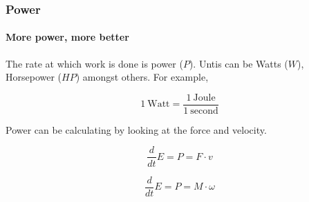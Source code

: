 \documentclass{beamer}%
\begin{document}
\begin{frame}
	\frametitle{Power}
	\framesubtitle{More power, more better}
	
	The rate at which work is done is power ($P$). Untis can be Watts ($W$), Horsepower ($HP$) amongst others. For example,
	
	\begin{equation}
		1 \ \mbox{Watt} = \frac{1 \ \mbox{Joule}}{1 \ \mbox{second}} \nonumber
	\end{equation}
	
	Power can be calculating by looking at the force and velocity.
	
	\begin{equation}
		\frac{d}{dt} E = P = F \cdot v
	\end{equation}
	
	\begin{equation}
		\frac{d}{dt} E = P = M \cdot \omega
	\end{equation}
\end{frame}
\end{document}
